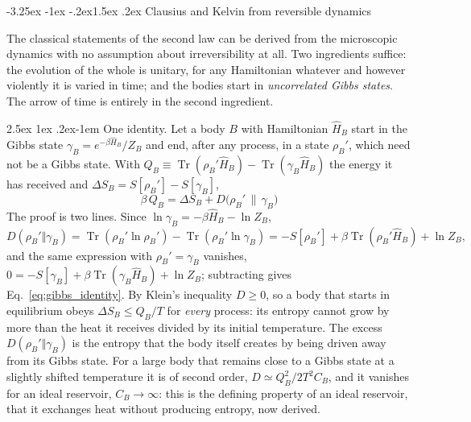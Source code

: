 \documentclass[10pt,a4paper]{article}
\makeatletter
\renewcommand{\subsection}{\@startsection{subsection}{2}{\z@}%
  {-3.25ex \@plus -1ex \@minus -.2ex}{1.5ex \@plus .2ex}%
  {\normalfont\fontsize{15.5pt}{19pt}\selectfont\bfseries}}
\renewcommand{\paragraph}{\@startsection{paragraph}{4}{\z@}%
  {2.5ex \@plus 1ex \@minus .2ex}{-1em}%
  {\normalfont\fontsize{14pt}{17pt}\selectfont\bfseries}}
\newcommand{\Tr}{\operatorname{Tr}}
\makeatother
\begin{document}
\subsection{Clausius and Kelvin from reversible dynamics}
\label{sec:found_statements}

The classical statements of the second law can be derived from the microscopic dynamics with no assumption about irreversibility at all.
Two ingredients suffice: the evolution of the whole is unitary, for any Hamiltonian whatever and however violently it is varied in time; and the bodies start in \emph{uncorrelated Gibbs states}.
The arrow of time is entirely in the second ingredient.

\paragraph{One identity.}
Let a body $ B $ with Hamiltonian $ \hat H_B $ start in the Gibbs state $ \gamma_B = e^{-\beta\hat H_B}/Z_B $ and end, after any process, in a state $ \rho_B' $, which need not be a Gibbs state.
With $ Q_B \equiv \Tr(\rho_B'\hat H_B) - \Tr(\gamma_B\hat H_B) $ the energy it has received and $ \Delta S_B = S[\rho_B'] - S[\gamma_B] $,
\begin{equation}\label{eq:gibbs_identity}
  \beta\,Q_B = \Delta S_B + D\big(\rho_B'\,\big\|\,\gamma_B\big)
\end{equation}
The proof is two lines.
Since $ \ln\gamma_B = -\beta\hat H_B - \ln Z_B $,
\[
  D(\rho_B' \Vert \gamma_B) = \Tr(\rho_B'\ln\rho_B') - \Tr(\rho_B'\ln\gamma_B)
  = -S[\rho_B'] + \beta\Tr(\rho_B'\hat H_B) + \ln Z_B ,
\]
and the same expression with $ \rho_B' = \gamma_B $ vanishes, $ 0 = -S[\gamma_B] + \beta\Tr(\gamma_B\hat H_B) + \ln Z_B $; subtracting gives Eq.~\eqref{eq:gibbs_identity}.
By Klein's inequality $ D \geq 0 $, so a body that starts in equilibrium obeys $ \Delta S_B \leq Q_B/T $ for \emph{every} process: its entropy cannot grow by more than the heat it receives divided by its initial temperature.
The excess $ D(\rho_B' \Vert \gamma_B) $ is the entropy that the body itself creates by being driven away from its Gibbs state.
For a large body that remains close to a Gibbs state at a slightly shifted temperature it is of second order, $ D \simeq Q_B^{2}/2T^{2}C_B $, and it vanishes for an ideal reservoir, $ C_B \to \infty $: this is the defining property of an ideal reservoir, that it exchanges heat without producing entropy, now derived.
\end{document}
